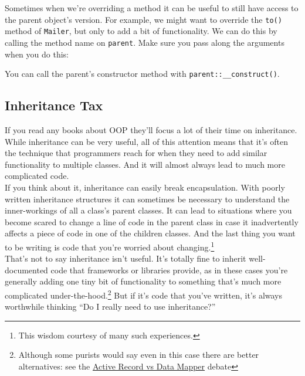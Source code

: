 Sometimes when we're overriding a method it can be useful to still have access to the parent object's version. For example, we might want to override the \texttt{to()} method of \texttt{Mailer}, but only to add a bit of functionality. We can do this by calling the method name on \texttt{parent}. Make sure you pass along the arguments when you do this:


You can call the parent's constructor method with \texttt{parent::\_\_construct()}.



\subsection{Inheritance Tax}


If you read any books about OOP they'll focus a lot of their time on inheritance. While inheritance can be very useful, all of this attention means that it's often the technique that programmers reach for when they need to add similar functionality to multiple classes. And it will almost always lead to much more complicated code.
\\

If you think about it, inheritance can easily break encapsulation. With poorly written inheritance structures it can sometimes be necessary to understand the inner-workings of all a class's parent classes. It can lead to situations where you become scared to change a line of code in the parent class in case it inadvertently affects a piece of code in one of the children classes. And the last thing you want to be writing is code that you're worried about changing.\footnote{This wisdom courtesy of many such experiences.}
\\

That's not to say inheritance isn't useful. It's totally fine to inherit well-documented code that frameworks or libraries provide, as in these cases you're generally adding one tiny bit of functionality to something that's much more complicated under-the-hood.\footnote{Although some purists would say even in this case there are better alternatives: see the \href{https://www.thoughtfulcode.com/orm-active-record-vs-data-mapper/}{Active Record vs Data Mapper} debate} But if it's code that you've written, it's always worthwhile thinking ``Do I really need to use inheritance?''
\\

